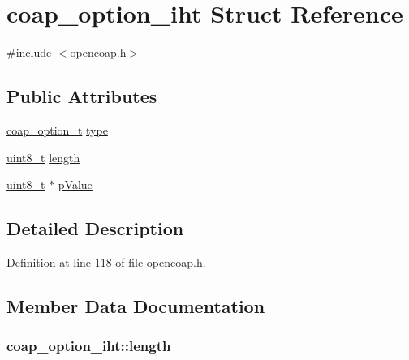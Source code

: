\hypertarget{structcoap__option__iht}{}\section{coap\+\_\+option\+\_\+iht Struct Reference}
\label{structcoap__option__iht}


{\ttfamily \#include $<$opencoap.\+h$>$}

\subsection*{Public Attributes}
\begin{DoxyCompactItemize}
\item 
\hyperlink{group__open_coap_ga809c9a7522aa7e4726b4a95ccdb2833b}{coap\+\_\+option\+\_\+t} \hyperlink{structcoap__option__iht_af24849eefc846d0dba40fc0f12e1d1a9}{type}
\item 
\hyperlink{_p_e___types_8h_aba7bc1797add20fe3efdf37ced1182c5}{uint8\+\_\+t} \hyperlink{structcoap__option__iht_a3f4044191ed0bea8b5e898b3ff9e9e5d}{length}
\item 
\hyperlink{_p_e___types_8h_aba7bc1797add20fe3efdf37ced1182c5}{uint8\+\_\+t} $\ast$ \hyperlink{structcoap__option__iht_a6ae9caef21a61bb806682d0fc45df665}{p\+Value}
\end{DoxyCompactItemize}


\subsection{Detailed Description}


Definition at line 118 of file opencoap.\+h.



\subsection{Member Data Documentation}
\subsubsection[{\texorpdfstring{length}{length}}]{ coap\+\_\+option\+\_\+iht\+::length}\hypertarget{structcoap__option__iht_a3f4044191ed0bea8b5e898b3ff9e9e5d}{}\label{structcoap__option__iht_a3f4044191ed0bea8b5e898b3ff9e9e5d}


